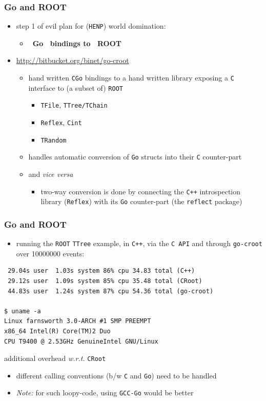 \documentclass[bigger]{beamer}
\providecommand{\alert}[1]{\textbf{#1}}
\begin{document}
\begin{frame}
\frametitle{Go and ROOT}
\label{sec-1-24}


\begin{itemize}
\item step 1 of evil plan for (\verb~HENP~) world domination:
\begin{itemize}
\item \alert{~Go~ bindings to ~ROOT~}
\end{itemize}
\item \href{http://bitbucket.org/binet/go-croot}{http://bitbucket.org/binet/go-croot}
\begin{itemize}
\item hand written \verb~CGo~ bindings to a hand written library exposing a
    \verb~C~ interface to (a subset of) \verb~ROOT~
\begin{itemize}
\item \verb~TFile~, \verb~TTree/TChain~
\item \verb~Reflex~, \verb~Cint~
\item \verb~TRandom~
\end{itemize}
\item handles automatic conversion of \verb~Go~ structs into their \verb~C~
    counter-part
\item and \emph{vice versa}
\begin{itemize}
\item two-way conversion is done by connecting the \verb~C++~ introspection
      library (\verb~Reflex~) with its \verb~Go~ counter-part (the \verb~reflect~
      package)
\end{itemize}
\end{itemize}
\end{itemize}
\end{frame}
\begin{frame}[fragile]
\frametitle{Go and ROOT}
\label{sec-1-25}


\begin{itemize}
\item running the \verb~ROOT~ \verb~TTree~ example, in \verb~C++~, via the \verb~C API~ and
  through \verb~go-croot~ over 10000000 events:
\end{itemize}

\begin{verbatim}
 29.04s user  1.03s system 86% cpu 34.83 total (C++)
 29.12s user  1.09s system 85% cpu 35.48 total (CRoot)
 44.83s user  1.24s system 87% cpu 54.36 total (go-croot)

$ uname -a
Linux farnsworth 3.0-ARCH #1 SMP PREEMPT 
x86_64 Intel(R) Core(TM)2 Duo 
CPU T9400 @ 2.53GHz GenuineIntel GNU/Linux

\end{verbatim}


additional overhead \emph{w.r.t.} \verb~CRoot~

\begin{itemize}
\item different calling conventions (b/w \verb~C~ and \verb~Go~) need to be handled
\item \emph{Note:} for such loopy-code, using \verb~GCC-Go~ would be better
\end{itemize}
\end{frame}
\end{document}
